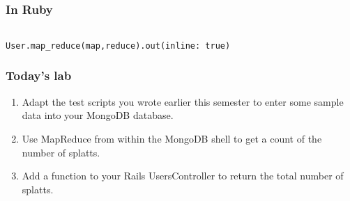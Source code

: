 \documentclass[10pt]{beamer}
\begin{document}
\begin{frame}[fragile]
  \frametitle{In Ruby}

 \begin{verbatim}

User.map_reduce(map,reduce).out(inline: true)
 \end{verbatim}

\end{frame}


\begin{frame}
  \frametitle{Today's lab}

 \begin{enumerate}
  \item Adapt the test scripts you wrote earlier this semester to 
	  enter some sample data into your MongoDB database.
  \item Use MapReduce from within the MongoDB shell to get a count of the number of splatts.
  \item Add a function to your Rails UsersController to return the total number of splatts.

 \end{enumerate}

\end{frame}
\end{document}
